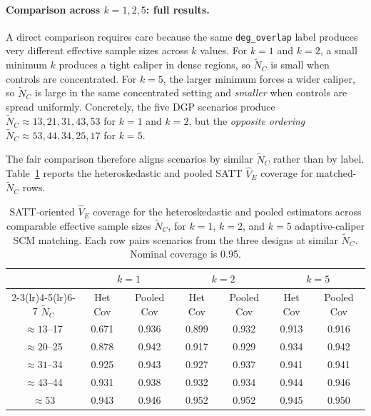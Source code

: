 \documentclass[11pt]{article}
\begin{document}
\paragraph{Comparison across $k = 1, 2, 5$: full results.}

A direct comparison requires care because the same \texttt{deg\_overlap} label produces very different effective sample sizes across $k$ values.
For $k=1$ and $k=2$, a small minimum $k$ produces a tight caliper in dense regions, so $\tilde{N}_C$ is small when controls are concentrated.
For $k=5$, the larger minimum forces a wider caliper, so $\tilde{N}_C$ is large in the same concentrated setting and \emph{smaller} when controls are spread uniformly.
Concretely, the five DGP scenarios produce $\tilde{N}_C \approx 13, 21, 31, 43, 53$ for $k=1$ and $k=2$, but the \emph{opposite ordering} $\tilde{N}_C \approx 53, 44, 34, 25, 17$ for $k=5$.

The fair comparison therefore aligns scenarios by similar $\tilde{N}_C$ rather than by label.
Table~\ref{tab:compare_k125} reports the heteroskedastic and pooled SATT $\hat{V}_E$ coverage for matched-$\tilde{N}_C$ rows.

\begin{table}[hbt!]
\centering
\begin{tabular}{ccccccc}
  \hline
  & \multicolumn{2}{c}{$k=1$} & \multicolumn{2}{c}{$k=2$} & \multicolumn{2}{c}{$k=5$} \\
  \cmidrule(lr){2-3}\cmidrule(lr){4-5}\cmidrule(lr){6-7}
  $\tilde{N}_C$ & Het Cov & Pooled Cov & Het Cov & Pooled Cov & Het Cov & Pooled Cov \\
  \hline
  $\approx 13$--17 & 0.671 & 0.936 & 0.899 & 0.932 & 0.913 & 0.916 \\
  $\approx 20$--25 & 0.878 & 0.942 & 0.917 & 0.929 & 0.934 & 0.942 \\
  $\approx 31$--34 & 0.925 & 0.943 & 0.927 & 0.937 & 0.941 & 0.941 \\
  $\approx 43$--44 & 0.931 & 0.938 & 0.932 & 0.934 & 0.944 & 0.946 \\
  $\approx 53$     & 0.943 & 0.946 & 0.952 & 0.952 & 0.945 & 0.950 \\
  \hline
\end{tabular}
\caption{SATT-oriented $\hat{V}_E$ coverage for the heteroskedastic and pooled estimators across comparable effective sample sizes $\tilde{N}_C$, for $k=1$, $k=2$, and $k=5$ adaptive-caliper SCM matching. Each row pairs scenarios from the three designs at similar $\tilde{N}_C$. Nominal coverage is 0.95.}
\label{tab:compare_k125}
\end{table}
\end{document}
